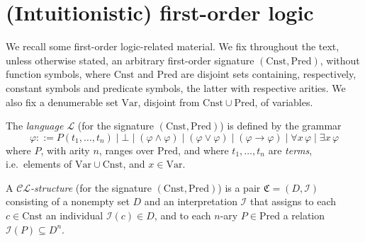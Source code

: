 \documentclass[submission,copyright,creativecommons]{eptcs}
\newcommand{\mo}{\mathfrak}
\renewcommand{\phi}{\varphi}
\newcommand{\Var}{\mathrm{Var}}
\newcommand{\Con}{\mathrm{Cnst}}
\newcommand{\Pred}{\mathrm{Pred}}
\newcommand{\II}{\mathscr{I}}
\newcommand{\CL}{\mathscr{C\!\!L}}   %
\newcommand{\LL}{\mathcal{L}}        %
\begin{document}
\section{(Intuitionistic) first-order logic}
\label{sec:ifol}

  We recall some first-order logic-related material. 
  We fix throughout the text, unless otherwise stated, an arbitrary first-order signature $(\Con,\Pred)$, without function symbols, where $\Con$ and $\Pred$ are disjoint sets containing, respectively, constant symbols and predicate symbols, the latter with respective arities.
  We also fix a denumerable set $\Var$, disjoint from $\Con\cup\Pred$, of variables. 

\begin{definition}
 The \emph{language $\LL$} (for the signature $(\Con,\Pred)$) is defined by the grammar 
  \begin{equation*}
    \phi ::= P(t_1, \ldots, t_n) 
      \mid \bot 
      \mid (\phi \wedge \phi)
      \mid (\phi \vee \phi)
      \mid (\phi \to \phi)
      \mid \forall x\, \phi
      \mid \exists x\, \phi
  \end{equation*}
  where $P$, with arity $n$, ranges over $\Pred$, and where
  $t_1, \ldots, t_n$ are \emph{terms}, i.e.~elements of $\Var \cup \Con$, and $x \in \Var$.
\end{definition}

\begin{definition}
  A \emph{$\CL$-structure} (for the signature $(\Con,\Pred)$) is a pair $\mo{C} = (D, \II)$
  consisting of a nonempty set $D$ and an interpretation $\II$ that assigns to each $c \in \Con$
  an individual $\II(c) \in D$, and to each $n$-ary
  $P \in \Pred$ a relation $\II(P) \subseteq D^n$.
\end{definition}
\end{document}
